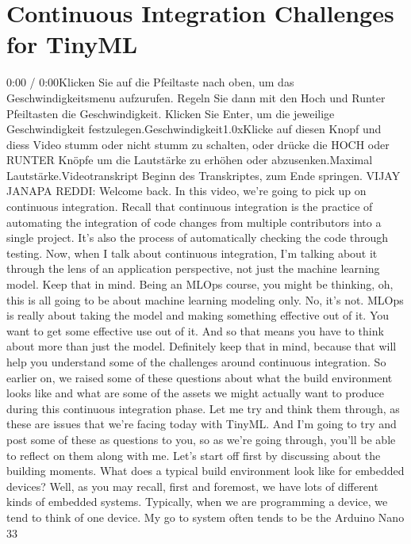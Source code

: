 {{{\section{Continuous Integration Challenges for TinyML}


    0:00 / 0:00Klicken Sie auf die Pfeiltaste nach oben, um das Geschwindigkeitsmenu aufzurufen. Regeln Sie dann mit den Hoch und Runter Pfeiltasten die Geschwindigkeit. Klicken Sie Enter, um die jeweilige Geschwindigkeit festzulegen.Geschwindigkeit1.0xKlicke auf diesen Knopf und diess Video stumm oder nicht stumm zu schalten, oder drücke die HOCH oder RUNTER Knöpfe um die Lautstärke zu erhöhen oder abzusenken.Maximal Lautstärke.Videotranskript
    Beginn des Transkriptes, zum Ende springen.
    VIJAY JANAPA REDDI: Welcome back.
    In this video, we're going to pick up on continuous integration.
    Recall that continuous integration is the practice
    of automating the integration of code changes from multiple contributors
    into a single project.
    It's also the process of automatically checking the code through testing.
    Now, when I talk about continuous integration,
    I'm talking about it through the lens of an application perspective,
    not just the machine learning model.
    Keep that in mind.
    Being an MLOps course, you might be thinking,
    oh, this is all going to be about machine learning modeling only.
    No, it's not.
    MLOps is really about taking the model and making
    something effective out of it.
    You want to get some effective use out of it.
    And so that means you have to think about more than just the model.
    Definitely keep that in mind, because that
    will help you understand some of the challenges
    around continuous integration.
    So earlier on, we raised some of these questions
    about what the build environment looks like
    and what are some of the assets we might actually
    want to produce during this continuous integration phase.
    Let me try and think them through, as these are issues
    that we're facing today with TinyML.
    And I'm going to try and post some of these as questions to you,
    so as we're going through, you'll be able to reflect on them along with me.
    Let's start off first by discussing about the building moments.
    What does a typical build environment look like for embedded devices?
    Well, as you may recall, first and foremost,
    we have lots of different kinds of embedded systems.
    Typically, when we are programming a device, we tend to think of one device.
    My go to system often tends to be the Arduino Nano 33
}}}
